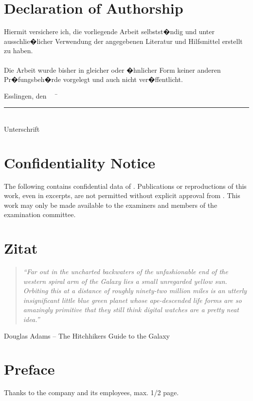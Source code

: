 \chapter*{Declaration of Authorship}

Hiermit versichere ich, die vorliegende Arbeit selbstst�ndig und unter ausschlie�licher Verwendung der angegebenen Literatur und Hilfsmittel erstellt zu haben.\\\\
Die Arbeit wurde bisher in gleicher oder �hnlicher Form keiner anderen Pr�fungsbeh�rde vorgelegt und auch nicht ver�ffentlicht.\\
\begin{tabbing}
          Esslingen, den \workDatum ~~	\= \rule{5cm}{0.3mm}\\
                                                                                                    \> Unterschrift
\end{tabbing}
%
\newpage
%
\chapter*{Confidentiality Notice} %

The following \workTyp contains confidential data of \workFirma.
Publications or reproductions of this work, even in excerpts, are not permitted without explicit approval from \workFirma.
This work may only be made available to the examiners and members of the examination committee.
\newpage
%
\chapter*{Zitat} %
\begin{center}
\begin{minipage}{12cm}
\begin{quotation}
\textit{\enquote{Far out in the uncharted backwaters of the unfashionable
end of the western spiral arm of the Galaxy lies a small unregarded
yellow sun. Orbiting this at a distance of roughly ninety-two
million miles is an utterly insignificant little blue green planet
whose ape-descended life forms are so amazingly primitive that they
still think digital watches are a pretty neat idea.}}
\end{quotation}
\hfill \textsf Douglas Adams -- The Hitchhikers Guide to the Galaxy
\end{minipage}
\end{center}
\newpage{}
\chapter*{Preface} %

Thanks to the company and its employees, max. 1/2 page.

\newpage
